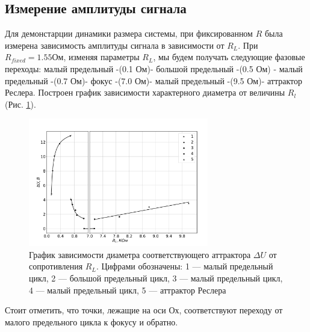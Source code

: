 \documentclass[12pt]{article}
\begin{document}
\subsection*{Измерение амплитуды сигнала }
Для демонстарции динамики размера системы, при фиксированном $R$ была измерена зависимость
амплитуды сигнала в зависимости от $R_L$.
При $R_{fixed} = 1.55 \text{Ом}$, изменяя параметры $R_L$, мы будем получать следующие фазовые переходы: малый предельный -(0.1 Ом)- большой предельный -(0.5 Ом) - малый предельный -(0.7 Ом)- фокус -(7.0 Ом)- малый предельный -(9.5 Ом)- аттрактор Реслера.
Построен график зависимости характерного диаметра от величины $R_l$ (Рис. \ref{fig:amplitudes_fix_R}).
\begin{figure}[H]
	\centering
	\includegraphics[width=0.7\textwidth]{Size_RL.pdf}
	\caption{График зависимости диаметра соответствующего аттрактора $\Delta U$ от сопротивления $R_L$. 
	Цифрами обозначены: 1 --- малый предельный цикл, 2 --- большой предельный цикл, 3 --- малый предельный цикл, 4 --- малый предельный цикл, 5 --- аттрактор Реслера}
	\label{fig:amplitudes_fix_R}
\end{figure}

Стоит отметить, что точки, лежащие на оси Ох, 
соответствуют переходу от малого предельного цикла к фокусу и обратно. 


\end{document}
